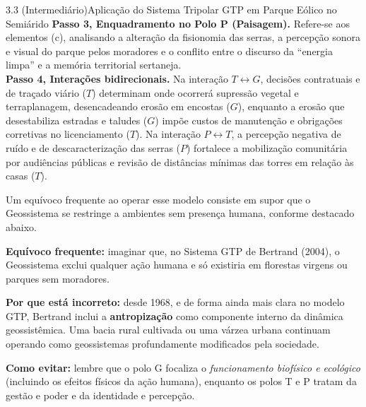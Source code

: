 \begin{boxExemplo}{3.3 (Intermediário)}{Aplicação do Sistema Tripolar GTP em Parque Eólico no Semiárido}
{\textbf{Passo 3, Enquadramento no Polo P (Paisagem).} Refere-se aos elementos (c), analisando a alteração da fisionomia das serras, a percepção sonora e visual do parque pelos moradores e o conflito entre o discurso da ``energia limpa'' e a memória territorial sertaneja.\\
\textbf{Passo 4, Interações bidirecionais.} Na interação $T \leftrightarrow G$, decisões contratuais e de traçado viário ($T$) determinam onde ocorrerá supressão vegetal e terraplanagem, desencadeando erosão em encostas ($G$), enquanto a erosão que desestabiliza estradas e taludes ($G$) impõe custos de manutenção e obrigações corretivas no licenciamento ($T$). Na interação $P \leftrightarrow T$, a percepção negativa de ruído e de descaracterização das serras ($P$) fortalece a mobilização comunitária por audiências públicas e revisão de distâncias mínimas das torres em relação às casas ($T$).}
\end{boxExemplo}

Um equívoco frequente ao operar esse modelo consiste em supor que o Geossistema se restringe a ambientes sem presença humana, conforme destacado abaixo.

\begin{boxErro}
\textbf{Equívoco frequente:} imaginar que, no Sistema GTP de Bertrand (2004), o Geossistema exclui qualquer ação humana e só existiria em florestas virgens ou parques sem moradores.

\textbf{Por que está incorreto:} desde 1968, e de forma ainda mais clara no modelo GTP, Bertrand inclui a \textbf{antropização} como componente interno da dinâmica geossistêmica. Uma bacia rural cultivada ou uma várzea urbana continuam operando como geossistemas profundamente modificados pela sociedade.

\textbf{Como evitar:} lembre que o polo G focaliza o \textit{funcionamento biofísico e ecológico} (incluindo os efeitos físicos da ação humana), enquanto os polos T e P tratam da gestão e poder e da identidade e percepção.
\end{boxErro}

